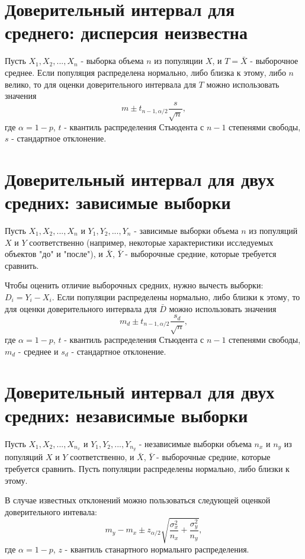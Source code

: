 \section{Доверительный интервал для среднего: дисперсия неизвестна}

Пусть $X_1, X_2, ..., X_n$ - выборка объема $n$ из популяции $X$, и $T = \bar{X}$ - выборочное среднее.
Если популяция распределена нормально, либо близка к этому, либо $n$ велико, то для оценки доверительного интервала для $T$ можно использовать значения
$$
m \pm t_{n-1, \alpha/2}\frac{s}{\sqrt{n}},
$$
где $\alpha = 1 - p$, $t$ - квантиль распределения Стьюдента с $n-1$ степенями свободы, $s$ - стандартное отклонение.


\section{Доверительный интервал для двух средних: зависимые выборки}

Пусть $X_1, X_2, ..., X_n$ и $Y_1, Y_2, ..., Y_n$ - зависимые выборки объема $n$ из популяций $X$ и $Y$ соответственно (например, некоторые характеристики исследуемых объектов "до" и "после"), и $\bar{X}$, $\bar{Y}$ - выборочные средние, которые требуется сравнить.

Чтобы оценить отличие выборочных средних, нужно вычесть выборки: $D_i = Y_i - X_i$.
Если популяции распределены нормально, либо близки к этому, то для оценки доверительного интервала для $\bar{D}$ можно использовать значения
$$
m_d \pm t_{n-1, \alpha/2}\frac{s_d}{\sqrt{n}},
$$
где $\alpha = 1 - p$, $t$ - квантиль распределения Стьюдента с $n-1$ степенями свободы, $m_d$ - среднее и $s_d$ - стандартное отклонение.


\section{Доверительный интервал для двух средних: независимые выборки}

Пусть $X_1, X_2, ..., X_{n_x}$ и $Y_1, Y_2, ..., Y_{n_y}$ - независимые выборки объема $n_x$ и $n_y$ из популяций $X$ и $Y$ соответственно, и $\bar{X}$, $\bar{Y}$ - выборочные средние, которые требуется сравнить.
Пусть популяции распределены нормально, либо близки к этому.

В случае известных отклонений можно пользоваться следующей оценкой доверительного интевала:
$$
m_y - m_x \pm z_{\alpha/2}\sqrt{\frac{\sigma_x^2}{n_x} + \frac{\sigma_y^2}{n_y}},
$$
где $\alpha = 1 - p$, $z$ - квантиль станартного нормальнго распределения.

